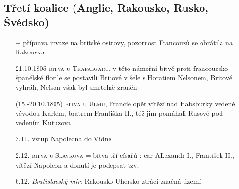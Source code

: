 \documentclass{article}
\begin{document}
\subsection*{Třetí koalice (Anglie, Rakousko, Rusko, Švédsko)}
\begin{itemize}
    \vspace{-0.5em}
    \setlength\itemsep{0.15em}
    \item[$-$] příprava invaze na britské ostrovy, pozornost Francouzů se obrátila na Rakousko
    \item[21.10.1805] \textsc{bitva u Trafalgaru}, v této námořní bitvě proti francouzsko-španělské flotile se postavili Britové v šele s Horatiem Nelsonem, Britové vyhráli, Nelson však byl smrtelně zraněn
    \item[(15.-20.10.1805)] \textsc{bitva u Ulmu}, Francie opět vítězí nad Habsburky vedené vévodou Karlem, bratrem Františka II., též jim pomáhali Rusové pod vedením Kutuzova
    \item[3.11.] vstup Napoleona do Vídně
    \item[2.12.] \textsc{bitva u Slavkova} = bitva tří císařů
    : car ALexandr I., František II., vítězí Napoleon a donutí je podepsat tzv.
    \item[6.12.] \textit{Bratislavský mír}: Rakousko-Uhersko ztrácí značná území
\end{itemize}
\end{document}

